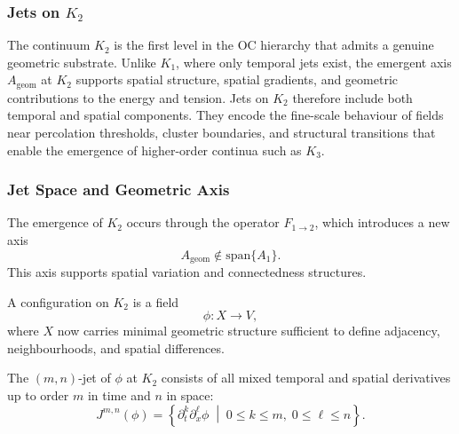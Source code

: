 
\subsubsection{Jets on \texorpdfstring{$K_2$}{K_2}}
\label{sec:jets-k2}

The continuum $K_2$ is the first level in the OC hierarchy that admits
a genuine geometric substrate. Unlike $K_1$, where only temporal jets
exist, the emergent axis $A_{\mathrm{geom}}$ at $K_2$ supports
spatial structure, spatial gradients, and geometric contributions to the
energy and tension. Jets on $K_2$ therefore include both temporal and
spatial components. They encode the fine-scale behaviour of fields near
percolation thresholds, cluster boundaries, and structural transitions
that enable the emergence of higher-order continua such as $K_3$.



\subsubsection{Jet Space and Geometric Axis}

The emergence of $K_2$ occurs through the operator $F_{1\to2}$, which
introduces a new axis
\[
A_{\mathrm{geom}}\notin \text{span}\{A_1\}.
\]
This axis supports spatial variation and connectedness structures.

A configuration on $K_2$ is a field
\[
\phi : X \to V,
\]
where $X$ now carries minimal geometric structure sufficient to define
adjacency, neighbourhoods, and spatial differences.

The $(m,n)$-jet of $\phi$ at $K_2$ consists of all mixed temporal and
spatial derivatives up to order $m$ in time and $n$ in space:
\[
J^{m,n}(\phi) =
\left\{
\partial_t^k \partial_x^\ell \phi \;\middle|\; 0\le k\le m,\; 0\le \ell\le n
\right\}.
\]

